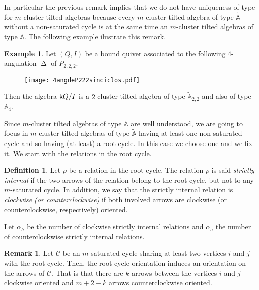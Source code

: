 \documentclass{amsart}
\theoremstyle{plain}
\theoremstyle{definition}
\newtheorem{defi}[teo]{Definition}
\newtheorem{obs}[teo]{Remark}
\newtheorem{ejem}[teo]{Example}
\begin{document}
In particular the previous remark implies that we do not have uniqueness of type for $m$-cluster tilted algebras because every  $m$-cluster tilted algebra of type $\tilde{\mathbb{A}}$
without a non-saturated cycle  is at the same time an  $m$-cluster tilted algebras of type $\mathbb{A}$. The following example ilustrate this remark. \\

\begin{ejem}
Let $(Q,I)$ be a bound  quiver associated to the following  $4$-angulation ${\mathop{\Delta}\nolimits}$ of  $P_{2,2,2}$.
\begin{figure}[H]
\begin{center}
\texttt{[image: 4angdeP222sinciclos.pdf]}
\end{center}
\end{figure}

 Then the algebra ${{\normalfont{\textsf{k}}}} Q/I$ is a $2$-cluster tilted algebra of  type $\widetilde{\mathbb{A}}_{2,2}$ and also of  type $\mathbb{A}_{4}$.

\end{ejem}
Since  $m$-cluster tilted algebras of  type $\mathbb{A}$ are well understood, \cite{Murphy2010, BB10, GubBust} we are going to focus in $m$-cluster tilted algebras of  type $\tilde{\mathbb{A}}$ having at least one non-saturated cycle and so having (at least) a root cycle. In this case we choose one and we fix it. We start with  the relations in the root cycle.

 \begin{defi}
Let  $\rho$ be a relation in the root cycle.  The  relation $\rho$ is said     \textit{
strictly internal}  if the two arrows of the relation belong to the root cycle, but not to any   $m$-saturated cycle. In addition, we say that  the strictly internal relation is \textit{clockwise (or counterclockwise)} if both involved arrows  are  clockwise (or counterclockwise, respectively) oriented.
\end{defi}

Let $\alpha_h$  be the number of  clockwise strictly internal relations and  $\alpha_a$ the number of  counterclockwise strictly internal relations.\\

\begin{obs}
Let  $\mathcal{C}$ be an  $m$-saturated cycle sharing at least two vertices  $i$ and $j$  with the root cycle. Then, the root cycle orientation induces an orientation on the arrows of   $\mathcal{C}$. That is that there are   $k$ arrows between the vertices $i$ and $j$ clockwise oriented and $m+2-k$ arrows counterclockwise oriented.
\end{obs}
\end{document}

